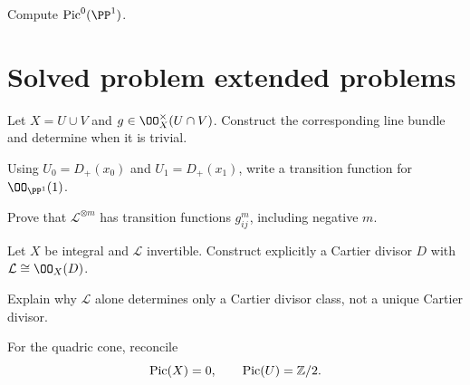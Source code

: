 \begin{exercise}\label{exr:vi42-24}
Compute \(\Pic^0(\PP^1)\).
\end{exercise}

\ifdefined\IncludeExerciseHints

\fi
\ifdefined\IncludeExerciseSolutions

\fi

\section{Solved problem extended problems}

\begin{problem}\label{prob:vi42-01}
Let \(X=U\cup V\) and \(g\in\OO_X^\times(U\cap V)\).  Construct the corresponding line bundle and determine when it is trivial.
\end{problem}

\begin{problem}\label{prob:vi42-02}
Using \(U_0=D_+(x_0)\) and \(U_1=D_+(x_1)\), write a transition function for \(\OO_{\PP^1}(1)\).
\end{problem}

\begin{problem}\label{prob:vi42-03}
Prove that \(\mathcal L^{\otimes m}\) has transition functions \(g_{ij}^m\), including negative \(m\).
\end{problem}

\begin{problem}\label{prob:vi42-04}
Let \(X\) be integral and \(\mathcal L\) invertible.  Construct explicitly a Cartier divisor \(D\) with \(\mathcal L\cong\OO_X(D)\).
\end{problem}

\begin{problem}\label{prob:vi42-05}
Explain why \(\mathcal L\) alone determines only a Cartier divisor class, not a unique Cartier divisor.
\end{problem}

\begin{problem}\label{prob:vi42-06}
For the quadric cone, reconcile
\[
  \operatorname{Pic}(X)=0,\qquad \operatorname{Pic}(U)=\mathbb Z/2.
\]
\end{problem}

